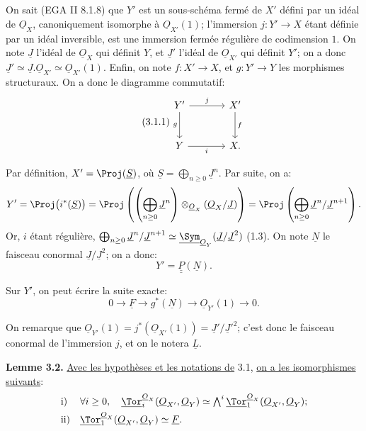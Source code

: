 
On sait (EGA II 8.1.8) que \(Y'\) est un sous-schéma fermé de \(X'\) défini par un idéal de \(\underline{O}_X\), canoniquement isomorphe à \(\underline{O}_{X'}(1)\); l'immersion \(j:Y'\to X\) étant définie par un idéal inversible, est une immersion fermée régulière de codimension \(1\). On note \(\underline{J}\) l'idéal de \(\underline{O}_X\) qui définit \(Y\), et \(\underline{J}'\) l'idéal de \(\underline{O}_{X'}\) qui définit \(Y'\); on a donc \(\underline{J}'\simeq \underline{J}.\underline{O}_{X'}\simeq\underline{O}_{X'}(1)\). Enfin, on note \(f:X'\to X\), et \(g:Y'\to Y\) les morphismes structuraux. On a donc le diagramme commutatif:
\begin{equation}\tag{3.1.1}
\begin{tikzcd}[column sep=large,row sep=large]
Y' \arrow[r,"j"] \arrow[d,"g"'] & X' \arrow[d,"f"]\\
Y \arrow[r,"i"'] & X.
\end{tikzcd}
\end{equation}

Par définition, \(X'=\Proj(\underline{S})\), où \(\underline{S}=\bigoplus_{n\ge0}\underline{J}^n\). Par suite, on a:
\[
Y'=\Proj\bigl(i^*(\underline{S})\bigr)
=\Proj\left(\left(\bigoplus_{n\ge0}\underline{J}^n\right)\otimes_{\underline{O}_X}(\underline{O}_X/\underline{J})\right)
=\Proj\left(\bigoplus_{n\ge0}\underline{J}^n/\underline{J}^{n+1}\right).
\]
Or, \(i\) étant régulière, \(\bigoplus_{n\ge0}\underline{J}^n/\underline{J}^{n+1}\simeq \underline{\Sym}_{\underline{O}_Y}(\underline{J}/\underline{J}^2)\) (1.3). On note \(\underline{N}\) le faisceau conormal \(\underline{J}/\underline{J}^2\); on a donc:
\[
Y'=\underline{\underline{P}}(\underline{N}).
\]

Sur \(Y'\), on peut écrire la suite exacte:
\begin{equation}\tag{3.1.2}
0\to \underline{F}\to g^*(\underline{N})\to\underline{O}_{Y'}(1)\to0.
\end{equation}

On remarque que \(\underline{O}_{Y'}(1)=j^*(\underline{O}_{X'}(1))=\underline{J}'/\underline{J}'^2\); c'est donc le faisceau conormal de l'immersion \(j\), et on le notera \(\underline{L}\).

\textbf{Lemme 3.2.} \uline{Avec les hypothèses et les notations de} 3.1, \uline{on a les isomorphismes suivants}:
\[
\begin{array}{ll}
\text{i)}&
\forall i\ge0,\quad
\underline{\Tor}_i^{\underline{O}_X}(\underline{O}_{X'},\underline{O}_Y)
\simeq
\bigwedge^i\underline{\Tor}_1^{\underline{O}_X}(\underline{O}_{X'},\underline{O}_Y);\\[4pt]
\text{ii)}&
\underline{\Tor}_1^{\underline{O}_X}(\underline{O}_{X'},\underline{O}_Y)\simeq \underline{F}.
\end{array}
\]


